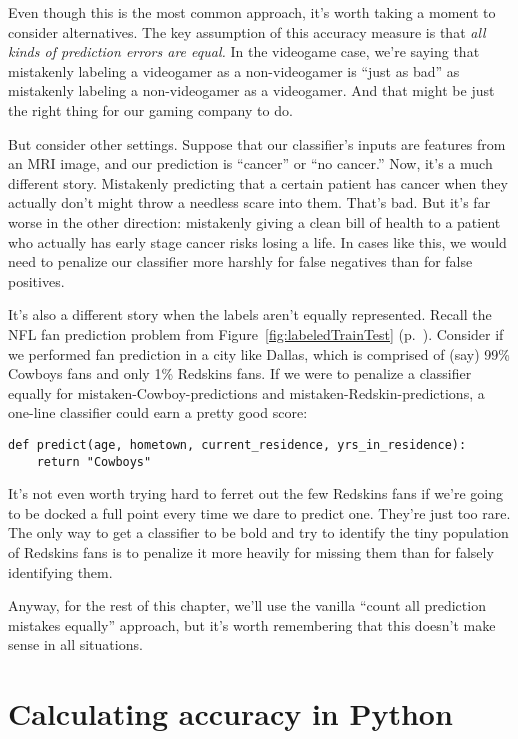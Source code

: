 Even though this is the most common approach, it's worth taking a moment to
consider alternatives. The key assumption of this accuracy measure is that
\textit{all kinds of prediction errors are equal.} In the videogame case, we're
saying that mistakenly labeling a videogamer as a non-videogamer is ``just as
bad'' as mistakenly labeling a non-videogamer as a videogamer. And that might
be just the right thing for our gaming company to do.

But consider other settings. Suppose that our classifier's inputs are features
from an MRI image, and our prediction is ``cancer'' or ``no cancer.'' Now, it's
a much different story. Mistakenly predicting that a certain patient has cancer
when they actually don't might throw a needless scare into them. That's bad.
But it's far worse in the other direction: mistakenly giving a clean bill of
health to a patient who actually has early stage cancer risks losing a life. In
cases like this, we would need to penalize our classifier more harshly for
false negatives than for false positives.

It's also a different story when the labels aren't equally represented. Recall
the NFL fan prediction problem from Figure~\ref{fig:labeledTrainTest}
(p.~\pageref{fig:labeledTrainTest}). Consider if we performed fan prediction in
a city like Dallas, which is comprised of (say) 99\% Cowboys fans and only 1\%
Redskins fans. If we were to penalize a classifier equally for
mistaken-Cowboy-predictions and mistaken-Redskin-predictions, a one-line
classifier could earn a pretty good score:

\begin{Verbatim}[fontsize=\footnotesize,samepage=true,frame=single,framesep=3mm]
def predict(age, hometown, current_residence, yrs_in_residence):
    return "Cowboys"
\end{Verbatim}
 
It's not even worth trying hard to ferret out the few Redskins fans if we're
going to be docked a full point every time we dare to predict one. They're just
too rare. The only way to get a classifier to be bold and try to identify the
tiny population of Redskins fans is to penalize it more heavily for missing
them than for falsely identifying them.

Anyway, for the rest of this chapter, we'll use the vanilla ``count all
prediction mistakes equally'' approach, but it's worth remembering that this
doesn't make sense in all situations.

\section{Calculating accuracy in Python}

